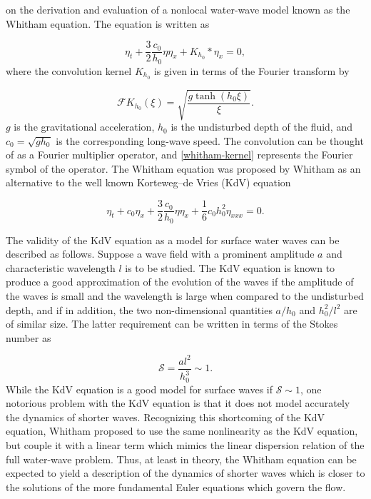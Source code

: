 on the derivation and evaluation of a nonlocal water-wave model
known as the Whitham equation. The equation is written as

\begin{equation}
\eta_t + \frac{3}{2} \frac{c_0}{h_0} \eta \eta_x + K_{h_0} \ast \eta_x = 0, 
\label{whitham-equation}
\end{equation}
where the convolution kernel $K_{h_0}$ is given in terms of the Fourier
transform by

\begin{equation}
\mathcal{F}K_{h_0} (\xi) =  \sqrt{\frac{g \tanh(h_0\xi)}{\xi}}.
\label{whitham-kernel}
\end{equation}
$g$ is the gravitational acceleration, $h_0$ is the undisturbed depth of
the fluid, and $c_0 = \sqrt{gh_0}$ is the corresponding long-wave speed.
The convolution can be thought of as a Fourier multiplier operator,
and \eqref{whitham-kernel} represents the Fourier symbol of the operator.
The Whitham equation was proposed by Whitham \cite{Whitham1967} as an
alternative to the well known Korteweg–de Vries (KdV) equation

\begin{equation}
\eta_t + c_0 \eta_x + \frac{3}{2} \frac{c_0}{h_0} \eta \eta_x + \frac{1}{6} c_0 h_0^2 \eta_{xxx} = 0.
\label{kdv-equation}
\end{equation}


The validity of the KdV equation as a model for surface water waves
can be described as follows. Suppose a wave field with a prominent
amplitude $a$ and characteristic wavelength $l$ is to be studied. The
KdV equation is known to produce a good approximation of the
evolution of the waves if the amplitude of the waves is small and
the wavelength is large when compared to the undisturbed depth,
and if in addition, the two non-dimensional quantities $a / h_0$ and
$h_0^2 / l^2$ are of similar size. The latter requirement can be written in
terms of the Stokes number as

\begin{equation}
\mathcal{S} = \frac{a l^2}{h_0^3} \sim 1. 
\label{stockes-number}
\end{equation}
While the KdV equation is a good model for surface waves if $\mathcal{S} \sim 1$, 
one notorious problem with the KdV equation is that it does
not model accurately the dynamics of shorter waves. Recognizing
this shortcoming of the KdV equation, Whitham proposed to use
the same nonlinearity as the KdV equation, but couple it with a
linear term which mimics the linear dispersion relation of the full
water-wave problem. Thus, at least in theory, the Whitham
equation can be expected to yield a description of the dynamics
of shorter waves which is closer to the solutions of the more
fundamental Euler equations which govern the flow.

